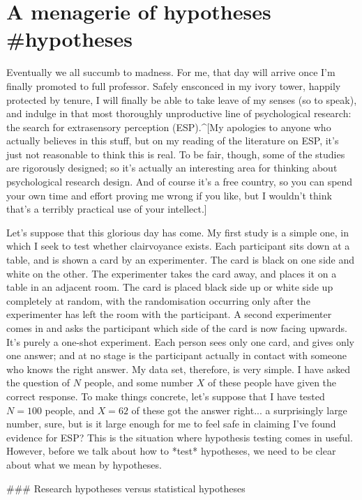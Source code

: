 \section{A menagerie of hypotheses {#hypotheses}}


Eventually we all succumb to madness. For me, that day will arrive once I'm finally promoted to full professor. Safely ensconced in my ivory tower, happily protected by tenure, I will finally be able to take leave of my senses (so to speak), and  indulge in that most thoroughly unproductive line of psychological research: the search for extrasensory perception (ESP).^[My apologies to anyone who actually believes in this stuff, but on my reading of the literature on ESP, it's just not reasonable to think this is real. To be fair, though, some of the studies are rigorously designed; so it's actually an interesting area for thinking about psychological research design. And of course it's a free country, so you can spend your own time and effort proving me wrong if you like, but I wouldn't think that's a terribly practical use of your intellect.] 

Let's suppose that this glorious day has come. My first study is a simple one, in which I seek to test whether clairvoyance exists. Each participant sits down at a table, and is shown a card by an experimenter. The card is black on one side and white on the other. The experimenter takes the card away, and places it on a table in an adjacent room. The card is placed black side up or white side up completely at random, with the randomisation occurring only after the experimenter has left the room with the participant. A second experimenter comes in and asks the participant which side of the card is now facing upwards. It's purely a one-shot experiment. Each person sees only one card, and gives only one answer; and at no stage is the participant actually in contact with someone who knows the right answer. My data set, therefore, is very simple. I have asked the question of $N$ people, and some number $X$ of these people have given the correct response. To make things concrete, let's suppose that I have tested $N = 100$ people, and $X = 62$ of these got the answer right... a surprisingly large number, sure, but is it large enough for me to feel safe in claiming I've found evidence for ESP? This is the situation where hypothesis testing comes in useful. However, before we talk about how to *test* hypotheses, we need to be clear about what we mean by hypotheses.

### Research hypotheses versus statistical hypotheses

